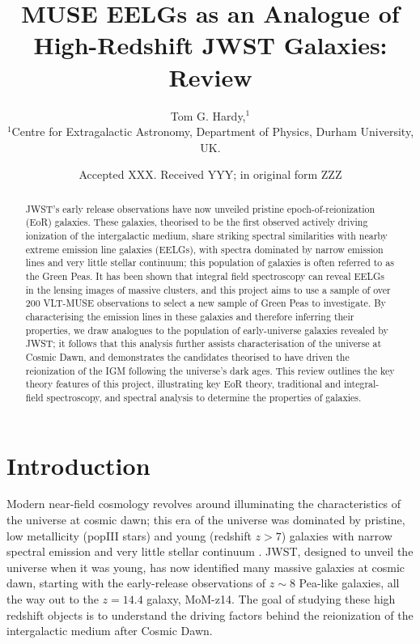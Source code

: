 \documentclass[fleqn,usenatbib]{mnras}
\title[MPhys Project Review]{MUSE EELGs as an Analogue of High-Redshift JWST Galaxies: Review}
\author[Tom G. Hardy]{
Tom G. Hardy,$^{1}$
\\
$^{1}$Centre for Extragalactic Astronomy, Department of Physics, Durham University, UK.
}
\date{Accepted XXX. Received YYY; in original form ZZZ}
\begin{document}
\label{firstpage}
\pagerange{\pageref{firstpage}--\pageref{lastpage}}
\maketitle

\begin{abstract}
JWST’s early release observations have now unveiled pristine epoch-of-reionization (EoR) galaxies. These galaxies, theorised to be the first observed actively driving ionization of the intergalactic medium, share striking spectral similarities with nearby extreme emission line galaxies (EELGs), with spectra dominated by narrow emission lines and very little stellar continuum; this population of galaxies is often referred to as the Green Peas. It has been shown that integral field spectroscopy can reveal EELGs in the lensing images of massive clusters, and this project aims to use a sample of over 200 VLT-MUSE observations to select a new sample of Green Peas to investigate. By characterising the emission lines in these galaxies and therefore inferring their properties, we draw analogues to the population of early-universe galaxies revealed by JWST; it follows that this analysis further assists characterisation of the universe at Cosmic Dawn, and demonstrates the candidates theorised to have driven the reionization of the IGM following the universe’s dark ages. This review outlines the key theory features of this project, illustrating key EoR theory, traditional and integral-field spectroscopy, and spectral analysis to determine the properties of galaxies.
\end{abstract}

\begin{keywords}
\end{keywords}



\section{Introduction}

Modern near-field cosmology revolves around illuminating the characteristics of the universe at cosmic dawn; this era of the universe was dominated by pristine, low metallicity (popIII stars) and young (redshift $z>7$) galaxies with narrow spectral emission and very little stellar continuum \citep{klessen, zaroubi}. JWST, designed to unveil the universe when it was young, has now identified many massive galaxies at cosmic dawn, starting with the \cite{Rhoads} early-release observations of $z\sim8$ Pea-like galaxies, all the way out to the \cite{naidu_2025} $z=14.4$ galaxy, MoM-z14. The goal of studying these high redshift objects is to understand the driving factors behind the reionization of the intergalactic medium after Cosmic Dawn.
\end{document}
